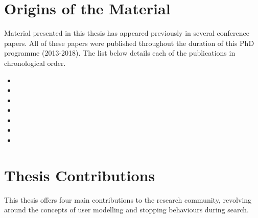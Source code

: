 \section{Origins of the Material}
Material presented in this thesis has appeared previously in several conference papers. All of these papers were published throughout the duration of this PhD programme (2013-2018). The list below details each of the publications in chronological order.

\begin{itemize}
    \item{}
    \item{}
    \item{}
    \item{}
    \item{}
    \item{}
    \item{}
\end{itemize}

\section{Thesis Contributions}
This thesis offers four main contributions to the research community, revolving around the concepts of user modelling and stopping behaviours during search.

